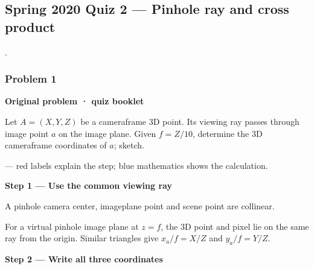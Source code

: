 \documentclass[letterpaper,11pt,english,openany,oneside]{jupyterBook}
\begin{document}
\subsection{Spring 2020 Quiz 2 — Pinhole ray and cross product}
\label{\detokenize{lectures/lecture03/quiz-workbook:spring-2020-quiz-2-pinhole-ray-and-cross-product}}\label{\detokenize{lectures/lecture03/quiz-workbook:quiz-source-14}}
\sphinxAtStartPar
{} .


\subsubsection{Problem 1}
\label{\detokenize{lectures/lecture03/quiz-workbook:quiz-14-q1}}\label{\detokenize{lectures/lecture03/quiz-workbook:ex-lec03-ray}}\label{\detokenize{lectures/lecture03/quiz-workbook:id5}}
\par\medskip\textbf{Original problem · quiz booklet}\par\smallskip

\sphinxAtStartPar
Let \(A=(X,Y,Z)\) be a camera\sphinxhyphen{}frame 3D point. Its viewing ray passes through image point \(a\) on the image plane. Given \(f=Z/10\), determine the 3D camera\sphinxhyphen{}frame coordinates of \(a\); sketch.

\par\medskip

\sphinxAtStartPar
{} — red labels explain the step; blue mathematics shows the calculation.

\par\medskip{}
{\color{QuizStepRed}\bfseries Step 1 — Use the common viewing ray}\par\smallskip

\sphinxAtStartPar
{} A pinhole camera center, image\sphinxhyphen{}plane point and scene point are collinear.

\sphinxAtStartPar
For a virtual pinhole image plane at {\color{QuizMathBlue} \(z=f\)}, the 3D point and pixel lie on the same ray from the origin. Similar triangles give {\color{QuizMathBlue} \(x_a/f=X/Z\)} and {\color{QuizMathBlue} \(y_a/f=Y/Z\)}.

\par

\par\medskip{}
{\color{QuizStepRed}\bfseries Step 2 — Write all three coordinates}\par\smallskip
\end{document}
